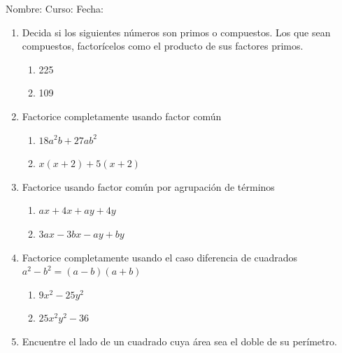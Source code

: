 \documentclass[letterpaper,fleqn]{article}
\newcommand{\LineaNombre}{%
\par
\vspace{\baselineskip}
Nombre:\hrulefill \; Curso: \underline{\hspace*{48pt}} \; Fecha: \underline{\hspace*{2.5cm}} \relax
\par}
\begin{document}
\LineaNombre
\begin{enumerate}
 \item Decida si los siguientes números son primos o compuestos. Los que sean compuestos, factorícelos como el producto de sus factores primos.
 \begin{enumerate}
 \item 225\noanswer
 \item 109 \noanswer
 \end{enumerate}
 \item Factorice completamente usando factor común
 \begin{enumerate}
 \item $18a^{2}b+27ab^{2}$\noanswer
 \item $x(x+2)+5(x+2)$\noanswer
 \end{enumerate}
 \item Factorice usando factor común por agrupación de términos
 \begin{enumerate}
 \item $ax+4x+ay+4y$\noanswer
 \item $3ax-3bx-ay+by$\noanswer
 \end{enumerate}
 \item Factorice completamente usando el caso diferencia de cuadrados \hspace*{24pt} $a^{2}-b^{2}=(a-b)(a+b)$
\begin{enumerate}
\item $9x^{2}-25y^{2}$\noanswer
\item $25x^{2}y^{2}-36$\noanswer
\end{enumerate}
\item Encuentre el lado de un cuadrado cuya área sea el doble de su perímetro.\noanswer
 \end{enumerate}
\end{document}

